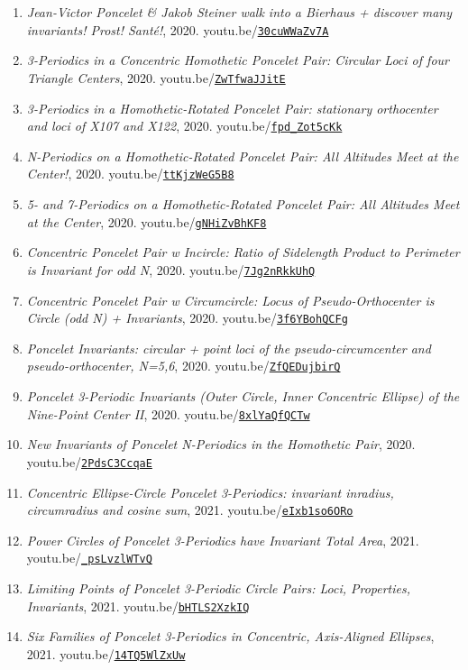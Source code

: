 \documentclass[12pt]{article}
\begin{document}
\begin{enumerate}[resume]
\item \textit{Jean-Victor Poncelet \& Jakob Steiner walk into a Bierhaus + discover many invariants! Prost! Santé!}, 2020. youtu.be/\href{https://youtu.be/30cuWWaZv7A}{\nolinkurl{30cuWWaZv7A}}
\item \textit{3-Periodics in a Concentric Homothetic Poncelet Pair: Circular Loci of four Triangle Centers}, 2020. youtu.be/\href{https://youtu.be/ZwTfwaJJitE}{\nolinkurl{ZwTfwaJJitE}}
\item \textit{3-Periodics in a Homothetic-Rotated Poncelet Pair: stationary orthocenter and loci of X107 and X122}, 2020. youtu.be/\href{https://youtu.be/fpd_Zot5cKk}{\nolinkurl{fpd\_Zot5cKk}}
\item \textit{N-Periodics on a Homothetic-Rotated Poncelet Pair: All Altitudes Meet at the Center!}, 2020. youtu.be/\href{https://youtu.be/ttKjzWeG5B8}{\nolinkurl{ttKjzWeG5B8}}
\item \textit{5- and 7-Periodics on a Homothetic-Rotated Poncelet Pair: All Altitudes Meet at the Center}, 2020. youtu.be/\href{https://youtu.be/gNHiZvBhKF8}{\nolinkurl{gNHiZvBhKF8}}
\item \textit{Concentric Poncelet Pair w Incircle: Ratio of Sidelength Product to Perimeter is Invariant for odd N}, 2020. youtu.be/\href{https://youtu.be/7Jg2nRkkUhQ}{\nolinkurl{7Jg2nRkkUhQ}}
\item \textit{Concentric Poncelet Pair w Circumcircle: Locus of Pseudo-Orthocenter is Circle (odd N) + Invariants}, 2020. youtu.be/\href{https://youtu.be/3f6YBohQCFg}{\nolinkurl{3f6YBohQCFg}}
\item \textit{Poncelet Invariants:
circular + point loci of the pseudo-circumcenter and pseudo-orthocenter, N=5,6}, 2020. youtu.be/\href{https://youtu.be/ZfQEDujbirQ}{\nolinkurl{ZfQEDujbirQ}}
\item \textit{Poncelet 3-Periodic Invariants (Outer Circle, Inner Concentric Ellipse) of the Nine-Point Center II}, 2020. youtu.be/\href{https://youtu.be/8xlYaQfQCTw}{\nolinkurl{8xlYaQfQCTw}}
\item \textit{New Invariants of Poncelet N-Periodics in the Homothetic Pair}, 2020. youtu.be/\href{https://youtu.be/2PdsC3CcqaE}{\nolinkurl{2PdsC3CcqaE}}
\item \textit{Concentric Ellipse-Circle Poncelet 3-Periodics: invariant inradius, circumradius and cosine sum}, 2021. youtu.be/\href{https://youtu.be/eIxb1so6ORo}{\nolinkurl{eIxb1so6ORo}}
\item \textit{Power Circles of Poncelet 3-Periodics have Invariant Total Area}, 2021. youtu.be/\href{https://youtu.be/_psLvzlWTvQ}{\nolinkurl{\_psLvzlWTvQ}}
\item \textit{Limiting Points of Poncelet 3-Periodic Circle Pairs: Loci, Properties, Invariants}, 2021. youtu.be/\href{https://youtu.be/bHTLS2XzkIQ}{\nolinkurl{bHTLS2XzkIQ}}
\item \textit{Six Families of Poncelet 3-Periodics in Concentric, Axis-Aligned Ellipses}, 2021. youtu.be/\href{https://youtu.be/14TQ5WlZxUw}{\nolinkurl{14TQ5WlZxUw}}
\end{enumerate}
\end{document}
